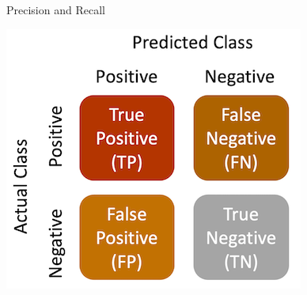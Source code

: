 \documentclass[handout]{beamer}
\begin{document}
\begin{frame}{Precision and Recall}
	
	\begin{center}
		\includegraphics{../pictures/confusionmatrix_words.png} \\\
	\end{center}
	



		
\end{frame}
\end{document}
